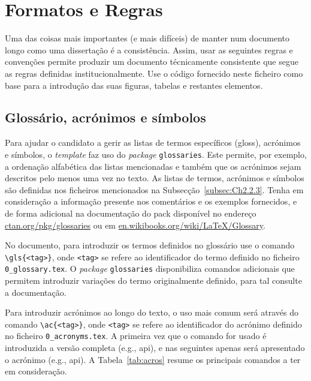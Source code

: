 
\section{Formatos e Regras}
\label{sec:Ch2.3}

Uma das coisas mais importantes (e mais difíceis) de manter num documento longo como uma dissertação é a consistência. Assim, usar as seguintes regras e convenções permite produzir um documento técnicamente consistente que segue as regras definidas institucionalmente. Use o código fornecido neste ficheiro como base para a introdução das suas figuras, tabelas e restantes elementos. 


\subsection{Glossário, acrónimos e símbolos}

Para ajudar o candidato a gerir as listas de termos específicos (\gls{gloss}), acrónimos e símbolos, o \textit{template} faz uso do \textit{package} \verb|glossaries|. Este permite, por exemplo, a ordenação alfabética das listas mencionadas e também que os acrónimos sejam descritos pelo menos uma vez no texto. As listas de termos, acrónimos e símbolos são definidas nos ficheiros mencionados na Subsecção~\ref{subsec:Ch2.2.3}. Tenha em consideração a informação presente nos comentários e os exemplos fornecidos, e de forma adicional na documentação do \gls{pack} disponível no endereço \url{ctan.org/pkg/glossaries} ou em \url{en.wikibooks.org/wiki/LaTeX/Glossary}.

No documento, para introduzir os termos definidos no glossário use o comando \verb|\gls{<tag>}|, onde \verb|<tag>| se refere ao identificador do termo definido no ficheiro \verb|0_glossary.tex|. O \textit{package} \verb|glossaries| disponibiliza comandos adicionais que permitem introduzir variações do termo originalmente definido, para tal consulte a documentação.

Para introduzir acrónimos ao longo do texto, o uso mais comum será através do comando \verb|\ac{<tag>}|, onde \verb|<tag>| se refere ao identificador do acrónimo definido no ficheiro \verb|0_acronyms.tex|. A primeira vez que o comando for usado é introduzida a versão completa (e.g., \ac{api}), e nas seguintes apenas será apresentado o acrónimo (e.g., \ac{api}). A Tabela~\ref{tab:acros} resume os principais comandos a ter em consideração. 

